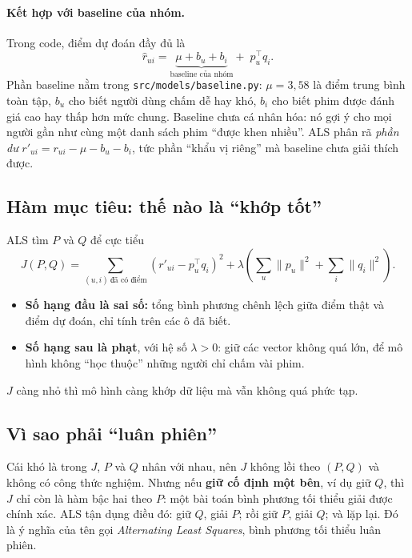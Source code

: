 \paragraph{Kết hợp với baseline của nhóm.} Trong code, điểm dự đoán đầy đủ là
\begin{equation}
  \hat r_{ui} = \underbrace{\mu + b_u + b_i}_{\text{baseline của nhóm}} + \; p_u^\top q_i .
\end{equation}
Phần baseline nằm trong \texttt{src/models/baseline.py}: $\mu = 3{,}58$ là điểm trung bình toàn tập, $b_u$
cho biết người dùng chấm dễ hay khó, $b_i$ cho biết phim được đánh giá cao hay thấp hơn mức chung. Baseline
chưa cá nhân hóa: nó gợi ý cho mọi người gần như cùng một danh sách phim ``được khen nhiều''. ALS phân rã
\emph{phần dư} $r'_{ui} = r_{ui} - \mu - b_u - b_i$, tức phần ``khẩu vị riêng'' mà baseline chưa giải
thích được.

\subsection{Hàm mục tiêu: thế nào là ``khớp tốt''}

ALS tìm $P$ và $Q$ để cực tiểu
\begin{equation}
  J(P, Q) = \sum_{(u,i)\ \text{đã có điểm}} \left(r'_{ui} - p_u^\top q_i\right)^2
          + \lambda\left(\sum_u \|p_u\|^2 + \sum_i \|q_i\|^2\right).
  \label{eq:als-objective}
\end{equation}
\begin{itemize}
  \item \textbf{Số hạng đầu là sai số:} tổng bình phương chênh lệch giữa điểm thật và điểm dự đoán, chỉ
        tính trên các ô đã biết.
  \item \textbf{Số hạng sau là phạt}, với hệ số $\lambda > 0$: giữ các vector không quá lớn, để mô hình
        không ``học thuộc'' những người chỉ chấm vài phim.
\end{itemize}
$J$ càng nhỏ thì mô hình càng khớp dữ liệu mà vẫn không quá phức tạp.

\subsection{Vì sao phải ``luân phiên''}

Cái khó là trong $J$, $P$ và $Q$ nhân với nhau, nên $J$ không lồi theo $(P, Q)$ và không có công thức
nghiệm. Nhưng nếu \textbf{giữ cố định một bên}, ví dụ giữ $Q$, thì $J$ chỉ còn là hàm bậc hai theo $P$:
một bài toán bình phương tối thiểu giải được chính xác. ALS tận dụng điều đó: giữ $Q$, giải $P$; rồi giữ
$P$, giải $Q$; và lặp lại. Đó là ý nghĩa của tên gọi \emph{Alternating Least Squares}, bình phương tối
thiểu luân phiên.


